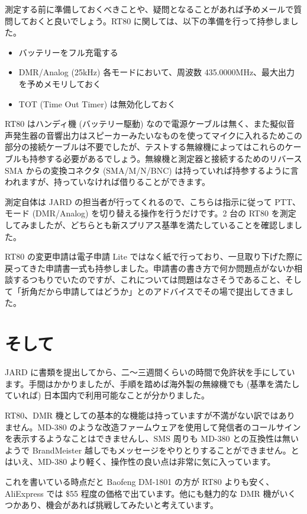 \documentclass[a4j,oneside]{ujbook}
\begin{document}
測定する前に準備しておくべきことや、疑問となることがあれば予めメールで質問しておくと良いでしょう。RT80 に関しては、以下の準備を行って持参しました。
\begin{itemize}
 \item バッテリーをフル充電する
 \item DMR/Analog (25kHz) 各モードにおいて、周波数 435.0000MHz、最大出力を予めメモリしておく
 \item TOT (Time Out Timer) は無効化しておく
\end{itemize}
RT80 はハンディ機 (バッテリー駆動) なので電源ケーブルは無く、また擬似音声発生器の音響出力はスピーカーみたいなものを使ってマイクに入れるためこの部分の接続ケーブルは不要でしたが、テストする無線機によってはこれらのケーブルも持参する必要があるでしょう。無線機と測定器と接続するためのリバース SMA からの変換コネクタ (SMA/M/N/BNC) は持っていれば持参するように言われますが、持っていなければ借りることができます。

測定自体は JARD の担当者が行ってくれるので、こちらは指示に従って PTT、モード (DMR/Analog) を切り替える操作を行うだけです。2 台の RT80 を測定してみましたが、どちらとも新スプリアス基準を満たしていることを確認しました。

RT80 の変更申請は電子申請 Lite ではなく紙で行っており、一旦取り下げた際に戻ってきた申請書一式も持参しました。申請書の書き方で何か問題点がないか相談するつもりでいたのですが、これについては問題はなさそうであること、そして「折角だから申請してはどうか」とのアドバイスでその場で提出してきました。

\section{そして}

JARD に書類を提出してから、二〜三週間くらいの時間で免許状を手にしています。手間はかかりましたが、手順を踏めば海外製の無線機でも (基準を満たしていれば) 日本国内で利用可能なことが分かりました。

RT80、DMR 機としての基本的な機能は持っていますが不満がない訳ではありません。MD-380 のような改造ファームウェアを使用して発信者のコールサインを表示するようなことはできませんし、SMS 周りも MD-380 との互換性は無いようで BrandMeister 越しでもメッセージをやりとりすることができません。とはいえ、MD-380 より軽く、操作性の良い点は非常に気に入っています。

これを書いている時点だと Baofeng DM-1801 の方が RT80 よりも安く、AliExpress では \$55 程度の価格で出ています。他にも魅力的な DMR 機がいくつかあり、機会があれば挑戦してみたいと考えています。
\end{document}
